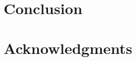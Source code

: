 \documentclass{article}
\begin{document}

\section{Conclusion}
\label{sec:conclusion}


\section*{Acknowledgments}




\end{document}

